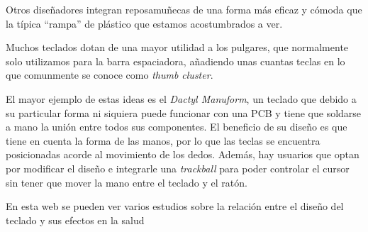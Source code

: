 Otros diseñadores integran reposamuñecas de una forma más eficaz y cómoda que la típica ``rampa'' de plástico que estamos acostumbrados a ver.

Muchos teclados dotan de una mayor utilidad a los pulgares, que normalmente solo utilizamos para la barra espaciadora, añadiendo unas cuantas teclas en lo que comunmente se conoce como \textit{thumb cluster}.

El mayor ejemplo de estas ideas es el \textit{Dactyl Manuform}, un teclado que debido a su particular forma ni siquiera puede funcionar con una PCB y tiene que soldarse a mano la unión entre todos sus componentes. El beneficio de su diseño es que tiene en cuenta la forma de las manos, por lo que las teclas se encuentra posicionadas acorde al movimiento de los dedos. Además, hay usuarios que optan por modificar el diseño e integrarle una \textit{trackball} para poder controlar el cursor sin tener que mover la mano entre el teclado y el ratón.
\label{img:dactyl}

\vspace*{\fill}
\hr
En esta web\cite{paper} se pueden ver varios estudios sobre la relación entre el diseño del teclado y sus efectos en la salud
